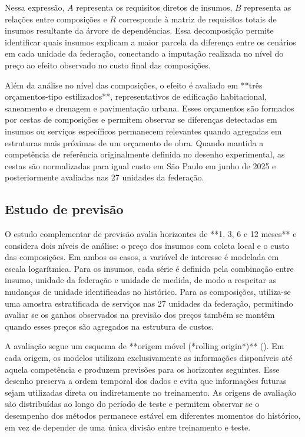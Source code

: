 Nessa expressão, \(A\) representa os requisitos diretos de insumos, \(B\) representa as relações entre composições e \(R\) 
corresponde à matriz de requisitos totais de insumos resultante da árvore de dependências. Essa decomposição permite 
identificar quais insumos explicam a maior parcela da diferença entre os cenários em cada unidade da federação, conectando a 
imputação realizada no nível do preço ao efeito observado no custo final das composições.

Além da análise no nível das composições, o efeito é avaliado em **três orçamentos-tipo estilizados**, representativos de 
edificação habitacional, saneamento e drenagem e pavimentação urbana. Esses orçamentos são formados por cestas de composições e 
permitem observar se diferenças detectadas em insumos ou serviços específicos permanecem relevantes quando agregadas em 
estruturas mais próximas de um orçamento de obra. Quando mantida a competência de referência originalmente definida no desenho 
experimental, as cestas são normalizadas para igual custo em São Paulo em junho de 2025 e posteriormente avaliadas nas 27 
unidades da federação.

\subsection{Estudo de previsão}

O estudo complementar de previsão avalia horizontes de **1, 3, 6 e 12 meses** e considera dois níveis de análise: o preço dos 
insumos com coleta local e o custo das composições. Em ambos os casos, a variável de interesse é modelada em escala logarítmica. 
Para os insumos, cada série é definida pela combinação entre insumo, unidade da federação e unidade de medida, de modo a 
respeitar as mudanças de unidade identificadas no histórico. Para as composições, utiliza-se uma amostra estratificada de 
serviços nas 27 unidades da federação, permitindo avaliar se os ganhos observados na previsão dos preços também se mantêm quando 
esses preços são agregados na estrutura de custos.

A avaliação segue um esquema de **origem móvel (*rolling origin*)** (). Em cada origem, os modelos utilizam 
exclusivamente as informações disponíveis até aquela competência e produzem previsões para os horizontes seguintes. Esse desenho 
preserva a ordem temporal dos dados e evita que informações futuras sejam utilizadas direta ou indiretamente no treinamento. 
As origens de avaliação são distribuídas ao longo do período de teste e permitem observar se o desempenho dos métodos permanece 
estável em diferentes momentos do histórico, em vez de depender de uma única divisão entre treinamento e teste.


